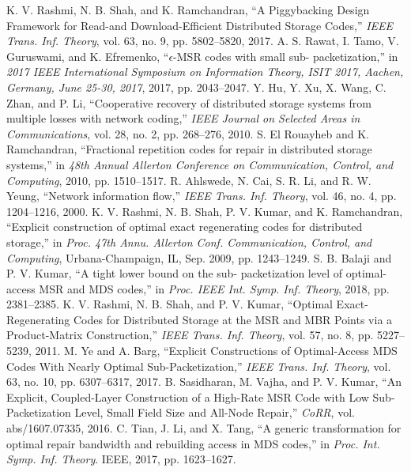 \begin{multicols}{2}
\begin{thebibliography}{99}
 K. V. Rashmi, N. B. Shah, and K. Ramchandran, ``A Piggybacking Design Framework for Read-and Download-Efficient Distributed Storage Codes,'' \textit{IEEE Trans. Inf. Theory}, vol. 63, no. 9, pp. 5802--5820, 2017.
 A. S. Rawat, I. Tamo, V. Guruswami, and K. Efremenko, ``$\epsilon$-MSR codes with small sub-
packetization,'' in \textit{2017 IEEE International Symposium on Information Theory, ISIT 2017, Aachen, Germany, June 25-30, 2017}, 2017, pp. 2043--2047.
 Y. Hu, Y. Xu, X. Wang, C. Zhan, and P. Li, ``Cooperative recovery of distributed storage systems from multiple losses with network coding,'' \textit{IEEE Journal on Selected Areas in Communications}, vol. 28, no. 2, pp. 268--276, 2010.
 S. El Rouayheb and K. Ramchandran, ``Fractional repetition codes for repair in distributed
storage systems,'' in \textit{48th Annual Allerton Conference on Communication, Control, and Computing}, 2010, pp. 1510--1517.
 R. Ahlswede, N. Cai, S. R. Li, and R. W. Yeung, ``Network information flow,'' \textit{IEEE Trans. Inf. Theory}, vol. 46, no. 4, pp. 1204--1216, 2000.
 K. V. Rashmi, N. B. Shah, P. V. Kumar, and K. Ramchandran, ``Explicit construction of optimal exact regenerating codes for distributed storage,'' in \textit{Proc. 47th Annu. Allerton Conf. Communication, Control, and Computing}, Urbana-Champaign, IL, Sep. 2009, pp. 1243--1249.
 S. B. Balaji and P. V. Kumar, ``A tight lower bound on the sub- packetization level of optimal-access MSR and MDS codes,'' in \textit{Proc. IEEE Int. Symp. Inf. Theory}, 2018, pp. 2381--2385.
 K. V. Rashmi, N. B. Shah, and P. V. Kumar, ``Optimal Exact-Regenerating Codes for Distributed Storage at the MSR and MBR Points via a Product-Matrix Construction,'' \textit{IEEE Trans. Inf. Theory}, vol. 57, no. 8, pp. 5227--5239, 2011.
 M. Ye and A. Barg, ``Explicit Constructions of Optimal-Access MDS Codes With Nearly Optimal Sub-Packetization,'' \textit{IEEE Trans. Inf. Theory}, vol. 63, no. 10, pp. 6307--6317, 2017.
 B. Sasidharan, M. Vajha, and P. V. Kumar, ``An Explicit, Coupled-Layer Construction of a High-Rate MSR Code with Low Sub-Packetization Level, Small Field Size and All-Node Repair,'' \textit{CoRR}, vol. abs/1607.07335, 2016.
 C. Tian, J. Li, and X. Tang, ``A generic transformation for optimal repair bandwidth and rebuilding access in MDS codes,'' in \textit{Proc. Int. Symp. Inf. Theory}. IEEE, 2017, pp. 1623--1627.

\end{thebibliography}
\end{multicols}
